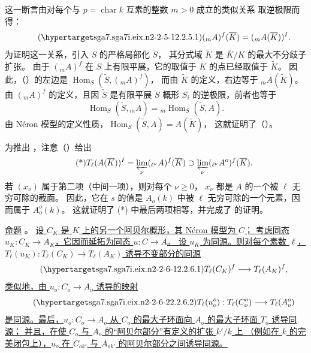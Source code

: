 这一断言由对每个与 $p=\operatorname{char}k$ 互素的整数 $m>0$ 成立的类似关系
取逆极限而得：
\begin{equation}\tag{\SGARefTarget{sga7.sga7i.eix.n2-2-5-1}{2.2.5.1}}
 ({}_mA)^f(\overline K)=({}_mA(\overline K))^I.
\end{equation}
为证明这一关系，引入 $S$ 的严格局部化 $\widetilde S$，
其分式域 $\widetilde K$ 是 $\overline K/K$ 的最大不分歧子扩张。
由于 $({}_mA)^f$ 在 $S$ 上有限平展，它的取值于 $\overline K$ 的点已经取值于 $\widetilde K$。
因此，（）的左边是
$\operatorname{Hom}_S(\widetilde S,({}_mA)^f)$，
而由 $\widetilde K$ 的定义，右边等于 ${}_mA(\widetilde K)$。
由 $({}_mA)^f$ 的定义，且因 $\widetilde S$ 是有限平展 $S$ 概形 $S_i$ 的逆极限，前者也等于
\[
 \operatorname{Hom}_S(\widetilde S,{}_mA)
 ={}_m\operatorname{Hom}_S(\widetilde S,A).
\]
由 N\'eron 模型的定义性质，$\operatorname{Hom}_S(\widetilde S,A)=A(\widetilde K)$，
这就证明了（）。

为推出 ，注意（）给出
\begin{equation}\tag{*}
 T_\ell(A(\overline K))^I
 =\varprojlim_\nu({}_{\ell^\nu}A)^f(\overline K)
 \supset\varprojlim_\nu({}_{\ell^\nu}A^o)^f(\overline K).
\end{equation}
若 $(x_\nu)$ 属于第二项（中间一项），则对每个 $\nu\geq0$，
$x_\nu$ 都是 $A$ 的一个被 $\ell$ 无穷可除的截面。
因此，它在 $s$ 的值是 $A_o(k)$ 中被 $\ell$ 无穷可除的一个元素，因而属于 $A_o^o(k)$。
这就证明了 (*) 中最后两项相等，并完成了  的证明。

\medskip
\noindent
\underline{命题} 。
\underline{设 $C_K$ 是 $K$ 上的另一个阿贝尔概形，其 N\'eron 模型为 $C$；
考虑同态 $u_K:C_K\longrightarrow A_K$，它因而延拓为同态 $u:C\longrightarrow A$。
设 $u_K$ 为同源。则对每个素数 $\ell$，
$T_\ell(u_K):T_\ell(C_K)\longrightarrow T_\ell(A_K)$ 诱导不变部分的同源}
\begin{equation}\tag{\SGARefTarget{sga7.sga7i.eix.n2-2-6-1}{2.2.6.1}}
 T_\ell(C_K)^f\longrightarrow T_\ell(A_K)^f,
\end{equation}
\underline{类似地，由 $u_o:C_o\longrightarrow A_o$ 诱导的映射}
\begin{equation}\tag{\SGARefTarget{sga7.sga7i.eix.n2-2-6-2}{2.2.6.2}}
 T_\ell(u_o^o):T_\ell(C_o^o)\longrightarrow T_\ell(A_o^o)
\end{equation}
\underline{是同源。最后，$u_o:C_o\longrightarrow A_o$ 从 $C_o$ 的最大子环面向 $A_o$ 的最大子环面 $T_o$ 诱导同源；
并且，在使 $C_o$ 与 $A_o$ 的“阿贝尔部分”有定义的扩张 $k'/k$ 上
（例如在 $k$ 的完美闭包上），$u_o$ 在 $C_{ok'}$ 与 $A_{ok'}$ 的阿贝尔部分之间诱导同源。}

